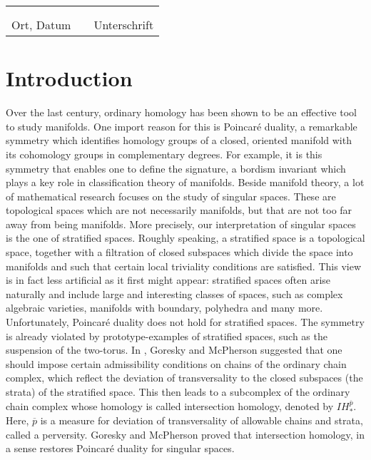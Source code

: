 \documentclass{scrreprt}
\begin{document}
\vspace{2cm}

\begin{tabular}{lp{2em}l}
 \hspace{4cm} && \hspace{7cm} \\ \cline{1-1}\cline{3-3} \\
 Ort, Datum && Unterschrift
\end{tabular}
\tableofcontents

\chapter{Introduction}

Over the last century, ordinary homology has been shown to be an effective tool to study manifolds. One import reason for this is Poincar\'{e} duality, a remarkable symmetry which identifies homology groups of a closed, oriented manifold with its cohomology groups in complementary degrees. For example, it is this symmetry that enables one to define the signature, a bordism invariant which plays a key role in classification theory of manifolds. Beside manifold theory, a lot of mathematical research focuses on the study of singular spaces. These are topological spaces which are not necessarily manifolds, but that are not too far away from being manifolds. More precisely, our interpretation of singular spaces is the one of stratified spaces. Roughly speaking, a stratified space is a topological space, together with a filtration of closed subspaces which divide the space into manifolds and such that certain local triviality conditions are satisfied. This view is in fact less artificial as it first might appear: stratified spaces often arise naturally and include large and interesting classes of spaces, such as complex algebraic varieties, manifolds with boundary, polyhedra and many more. \\
Unfortunately, Poincar\'{e} duality does not hold for stratified spaces. The symmetry is already violated by prototype-examples of stratified spaces, such as the suspension of the two-torus. In \cite{GM}, Goresky and McPherson suggested that one should impose certain admissibility conditions on chains of the ordinary chain complex, which reflect the deviation of transversality to the closed subspaces (the strata) of the stratified space. This then leads to a subcomplex of the ordinary chain complex whose homology is called intersection homology, denoted by $IH_*^{\overline{p}}$. Here, $\overline{p}$ is a measure for deviation of transversality of allowable chains and strata, called a perversity. Goresky and McPherson proved that intersection homology, in a sense restores Poincar\'{e} duality for singular spaces. \\
\end{document}
